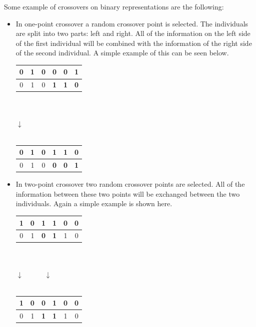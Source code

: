 Some example of crossovers on binary representations are the following:
\begin{itemize}
\item In one-point crossover a random crossover point is selected. The individuals are split into two parts: left and right. All of the information on the left side of the first individual will be combined with the information of the right side of the second individual. A simple example of this can be seen below.
\begin{center}
\begin{tabular}{|c|c|c|c|c|c|}
\hline
0 & 1 & 0 & \textbf{0} & \textbf{0} & \textbf{1} \\ \hline \hline
0 & 1 & 0 & \textbf{1} & \textbf{1} & \textbf{0} \\ \hline
\end{tabular}
\\
$\:$ \\
$\downarrow$ \\
$\:$ \\
\begin{tabular}{|c|c|c||c|c|c|}
\hline
0 & 1 & 0 & \textbf{1} & \textbf{1} & \textbf{0} \\ \hline \hline
0 & 1 & 0 & \textbf{0} & \textbf{0} & \textbf{1} \\ \hline
\end{tabular}
\end{center}
\item In two-point crossover two random crossover points are selected. All of the information between these two points will be exchanged between the two individuals. Again a simple example is shown here.
\begin{center}
\begin{tabular}{|c|c|c|c|c|c|}
\hline
1 & 0 & \textbf{1} & \textbf{1} & 0 & 0 \\ \hline \hline
0 & 1 & \textbf{0} & \textbf{1} & 1 & 0 \\ \hline
\end{tabular}
\\
$\:$ \\
$\downarrow \qquad \quad \downarrow$ \\
$\:$ \\
\begin{tabular}{|c|c||c|c||c|c|}
\hline
1 & 0 & \textbf{0} & \textbf{1} & 0 & 0 \\ \hline \hline
0 & 1 & \textbf{1} & \textbf{1} & 1 & 0 \\ \hline
\end{tabular}
\end{center}
\end{itemize}

